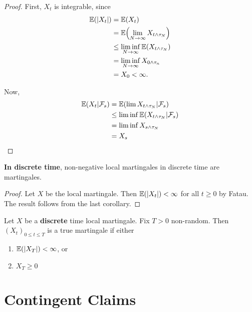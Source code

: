 \begin{proof}
  First, $X_{t}$ is integrable, since
  \begin{align}
    \label{eq:17}
    \E{|X_{t}|} &= \E{X_{t}} \\
    &= \E{\lim_{N \rightarrow \infty} X_{t \wedge \tau_{N}}} \\
    &\leq \liminf_{N \rightarrow \infty} \E{X_{t \wedge \tau_{N}}} \\
    &= \liminf_{N \rightarrow \infty} X_{0 \wedge \tau_{n}} \\
    &= X_{0} < \infty.
  \end{align}
  
  Now,
  \begin{align}
    \label{eq:16}
    \E{X_{t} | \mathcal{F}_{s}} &= \E{\lim X_{t \wedge \tau_{N}} |
      \mathcal{F}_{s}} \\
    &\leq \liminf \E{X_{t \wedge \tau_{N}} | \mathcal{F}_{s}} \\
    &= \liminf X_{s \wedge \tau_{N}} \\
    &= X_{s}
  \end{align}
\end{proof}

\begin{corollary}
  \textbf{In discrete time}, non-negative local martingales in
  discrete time are martingales.
\end{corollary}

\begin{proof}
  Let $X$ be the local martingale. Then $\E{|X_{t}|} < \infty$ for all
  $t \geq 0$ by Fatau. The result follows from the last corollary.
\end{proof}

\begin{thm}
  \label{defn:discrete_time_models:18}
  Let $X$ be a \textbf{discrete} time local martingale. Fix $T > 0$
  non-random. Then $(X_{t})_{0 \leq t \leq T}$ is a true martingale if
  either
  \begin{enumerate}
  \item $\E{|X_{T}|} < \infty$, or
  \item $X_T \geq 0$ 
  \end{enumerate}
\end{thm}


\section{Contingent Claims}
\label{sec:contigent-claims}


